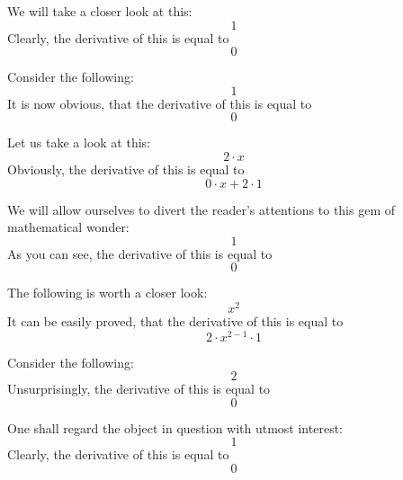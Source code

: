 \documentclass{article}
\begin{document}
We will take a closer look at this:
\begin{equation}
1 
\end{equation}
Clearly, the derivative of this is equal to
\begin{equation}
0 
\end{equation}

Consider the following:
\begin{equation}
1 
\end{equation}
It is now obvious, that the derivative of this is equal to
\begin{equation}
0 
\end{equation}

Let us take a look at this:
\begin{equation}
2 \cdot x 
\end{equation}
Obviously, the derivative of this is equal to
\begin{equation}
0 \cdot x + 2 \cdot 1 
\end{equation}

We will allow ourselves to divert the reader's attentions to this gem of mathematical wonder:
\begin{equation}
1 
\end{equation}
As you can see, the derivative of this is equal to
\begin{equation}
0 
\end{equation}

The following is worth a closer look:
\begin{equation}
x ^{2 } 
\end{equation}
It can be easily proved, that the derivative of this is equal to
\begin{equation}
2 \cdot x ^{2 - 1 } \cdot 1 
\end{equation}

Consider the following:
\begin{equation}
2 
\end{equation}
Unsurprisingly, the derivative of this is equal to
\begin{equation}
0 
\end{equation}

One shall regard the object in question with utmost interest:
\begin{equation}
1 
\end{equation}
Clearly, the derivative of this is equal to
\begin{equation}
0 
\end{equation}
\end{document}
